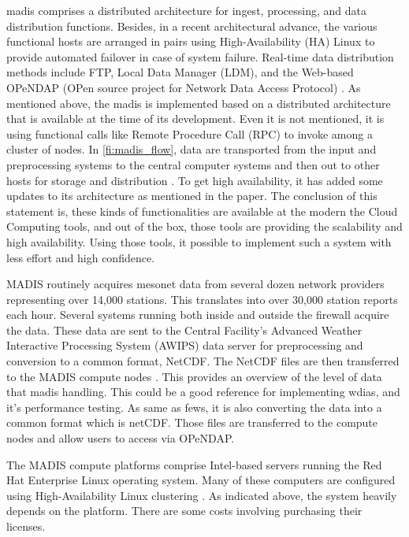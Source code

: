 \acrshort{madis} comprises a distributed architecture for ingest, processing, and data distribution functions.
Besides, in a recent architectural advance, the various functional hosts are arranged in pairs using High-Availability (HA) Linux to provide automated failover in case of system failure. Real-time data distribution methods include FTP, Local Data Manager (LDM), and the Web-based OPeNDAP (OPen source project for Network Data Access Protocol) \cite{Macdermaid2005ARCHITECTUREP2.39}. As mentioned above, the \acrshort{madis} is implemented based on a distributed architecture that is available at the time of its development. Even it is not mentioned, it is using functional calls like Remote Procedure Call (RPC) to invoke among a cluster of nodes. In \cref{fi:madis_flow}, data are transported from the input and preprocessing systems to the central computer systems and then out to other hosts for storage and distribution \cite{Macdermaid2005ARCHITECTUREP2.39}. To get high availability, it has added some updates to its architecture as mentioned in the paper. The conclusion of this statement is, these kinds of functionalities are available at the modern the Cloud Computing tools, and out of the box, those tools are providing the scalability and high availability. Using those tools, it possible to implement such a system with less effort and high confidence.

MADIS routinely acquires mesonet data from several dozen network providers representing over 14,000 stations. This translates into over 30,000 station reports each hour. Several systems running both inside and outside the firewall acquire the data. These data are sent to the Central Facility's Advanced Weather Interactive Processing System (AWIPS) data server for preprocessing and conversion to a common format, NetCDF. The NetCDF files are then transferred to the MADIS compute nodes \cite{Macdermaid2005ARCHITECTUREP2.39}. This provides an overview of the level of data that \acrshort{madis} handling. This could be a good reference for implementing \acrshort{wdias}, and it's performance testing. As same as \acrshort{fews}, it is also converting the data into a common format which is \acrshort{netCDF}. Those files are transferred to the compute nodes and allow users to access via OPeNDAP.

The MADIS compute platforms comprise Intel-based servers running the Red Hat Enterprise Linux operating system. Many of these computers are configured using High-Availability Linux clustering \cite{Macdermaid2005ARCHITECTUREP2.39}. As indicated above, the system heavily depends on the platform. There are some costs involving purchasing their licenses.

